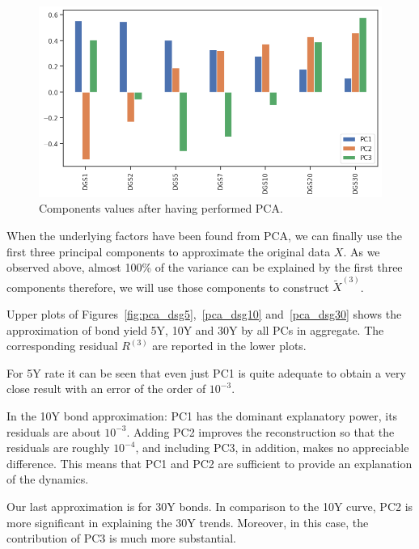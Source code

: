 \begin{figure}[hbtp]
	\centering
	\includegraphics[width=0.7\linewidth]{figures/yield_pca_components}
	\caption{Components values after having performed PCA.}
	\label{fig:yield_pca_components}
\end{figure}

When the underlying factors have been found from PCA, we can finally use the first three principal components to approximate the original data $X$. As we observed above, almost 100\% of the variance can be explained by the first three components therefore, we will use those components to construct $\tilde{X}^{(3)}$.

Upper plots of Figures~\ref{fig:pca_dsg5},~\ref{pca_dsg10} and~\ref{pca_dsg30} shows the approximation of bond yield 5Y, 10Y and 30Y by all PCs in aggregate.
The corresponding residual $R^{(3)}$ are reported in the lower plots.

For 5Y rate it can be seen that even just PC1 is quite adequate to obtain a very close result with an error of the order of $10^{-3}$.

In the 10Y bond approximation: PC1 has the dominant explanatory power, its residuals are about $10^{-3}$. Adding PC2 improves the reconstruction so that the residuals are roughly $10^{-4}$, and including PC3, in addition, makes no appreciable difference. This
means that PC1 and PC2 are sufficient to provide an explanation of the dynamics.

Our last approximation is for 30Y bonds. In comparison to the 10Y curve, PC2 is more significant in explaining the 30Y trends. Moreover, in this case, the contribution of PC3 is much more substantial.

